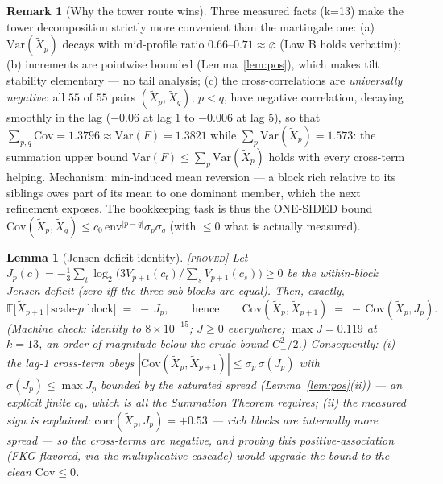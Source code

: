 \documentclass[11pt]{article}
\newtheorem{lemma}[theorem]{Lemma}
\theoremstyle{definition}
\newtheorem{remark}[theorem]{Remark}
\newcommand{\PROVED}{\textup{[\textsc{proved}]}}
\newcommand{\E}{\mathbb{E}}
\newcommand{\Var}{\mathrm{Var}}
\newcommand{\pbar}{\bar\varphi}
\begin{document}
\begin{remark}[Why the tower route wins]\label{rem:towerwins}
Three measured facts (k=13) make the tower decomposition strictly more
convenient than the martingale one: (a) $\Var(\tilde X_p)$ decays with
mid-profile ratio $0.66$--$0.71 \approx \pbar$ (Law B holds verbatim);
(b) increments are pointwise bounded (Lemma~\ref{lem:pos}), which makes
tilt stability elementary --- no tail analysis; (c) the cross-correlations
are \emph{universally negative}: all $55$ of $55$ pairs
$(\tilde X_p, \tilde X_q)$, $p < q$, have negative correlation, decaying
smoothly in the lag ($-0.06$ at lag $1$ to $-0.006$ at lag $5$), so that
$\sum_{p,q} \mathrm{Cov} = 1.3796 \approx \Var(F) = 1.3821$ while
$\sum_p \Var(\tilde X_p) = 1.573$: the summation upper bound
$\Var(F) \le \sum_p \Var(\tilde X_p)$ holds with every cross-term helping.
Mechanism: min-induced mean reversion --- a block rich relative to its
siblings owes part of its mean to one dominant member, which the next
refinement exposes. The bookkeeping task is thus the ONE-SIDED bound
$\mathrm{Cov}(\tilde X_p, \tilde X_q) \le c_0\,\mathrm{env}^{|p-q|}
\sigma_p \sigma_q$ (with $\le 0$ what is actually measured).
\end{remark}

\begin{lemma}[Jensen-deficit identity]\label{lem:jensen} \PROVED{}
Let $J_p(c) = -\tfrac13\sum_t \log_2\!\big(3V_{p+1}(c_t)/\sum_s V_{p+1}(c_s)\big)
\ge 0$ be the within-block Jensen deficit (zero iff the three sub-blocks are
equal). Then, exactly,
\[
\E\big[\tilde X_{p+1} \,\big|\, \text{scale-}p \text{ block}\big] \;=\; -\,J_p,
\qquad\text{hence}\qquad
\mathrm{Cov}(\tilde X_p, \tilde X_{p+1}) \;=\; -\,\mathrm{Cov}(\tilde X_p, J_p).
\]
(Machine check: identity to $8\times 10^{-15}$; $J \ge 0$ everywhere;
$\max J = 0.119$ at $k{=}13$, an order of magnitude below the crude bound
$C_-^2/2$.) Consequently: (i) the lag-1 cross-term obeys
$|\mathrm{Cov}(\tilde X_p, \tilde X_{p+1})| \le \sigma_p\,\sigma(J_p)$ with
$\sigma(J_p) \le \max J_p$ bounded by the saturated spread
(Lemma~\ref{lem:pos}(ii)) --- an explicit finite $c_0$, which is all the
Summation Theorem requires; (ii) the measured \emph{sign} is explained:
$\mathrm{corr}(\tilde X_p, J_p) = +0.53$ --- rich blocks are internally more
spread --- so the cross-terms are negative, and proving this
positive-association (FKG-flavored, via the multiplicative cascade) would
upgrade the bound to the clean $\mathrm{Cov} \le 0$.
\end{lemma}
\end{document}
